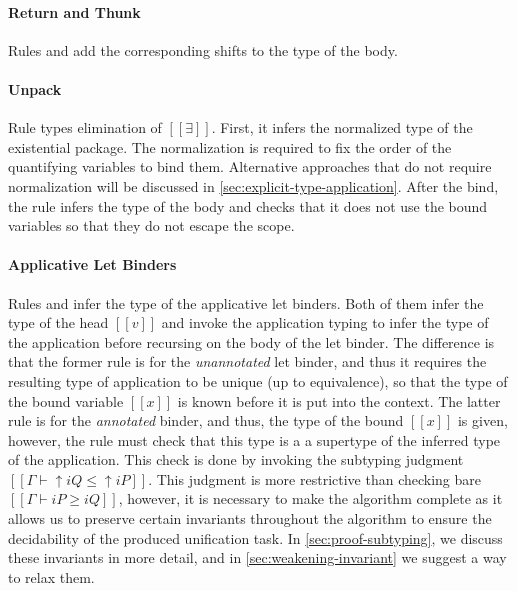 \paragraph{Return and Thunk}
  Rules  
  and 
  add the corresponding shifts to the type of the body.

\paragraph{Unpack}
  Rule  types elimination of $[[∃]]$.
  First, it infers the normalized type of the existential package.
  The normalization is required to fix the order of the quantifying variables
  to bind them. Alternative approaches that do not require normalization
  will be discussed in \cref{sec:explicit-type-application}.
  After the bind, the rule infers the type of the body 
  and checks that it does not use the bound variables so that they do not 
  escape the scope.

\paragraph{Applicative Let Binders}
  Rules  and 
  infer the type of the applicative let binders.
  Both of them infer the type of the head $[[v]]$ 
  and invoke the application typing to infer the type of the application 
  before recursing on the body of the let binder.
  The difference is that the former rule is for the 
  \emph{unannotated} let binder, and thus
  it requires the resulting type of application to be unique
  (up to equivalence), so that the type of the bound variable $[[x]]$
  is known before it is put into the context.
  The latter rule is for the \emph{annotated} binder,
  and thus, the type of the bound $[[x]]$ is given, 
  however, the rule must check that this type is a
  a supertype of the inferred type of the application. 
  This check is done by invoking the subtyping judgment
  $[[Γ ⊢ ↑iQ ≤ ↑iP]]$.
  This judgment is more restrictive than checking bare 
  $[[Γ ⊢ iP ≥ iQ]]$, however, it is necessary
  to make the algorithm complete as it allows us to preserve
  certain invariants throughout the algorithm to ensure
  the decidability of the produced unification task.
  In \cref{sec:proof-subtyping}, we discuss these invariants in
  more detail, and in \cref{sec:weakening-invariant} we suggest 
  a way to relax them.

